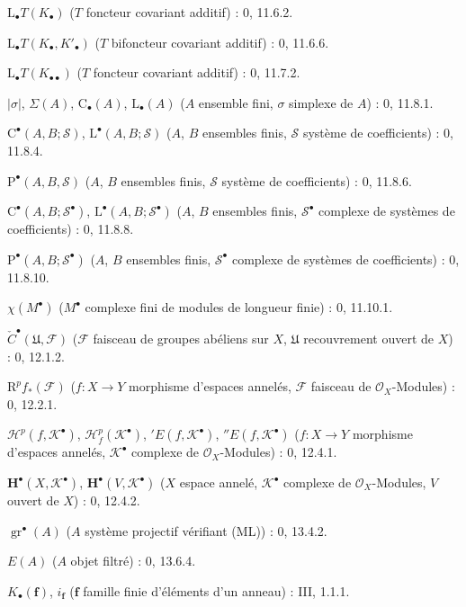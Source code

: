 \begin{flushleft}
$\mathrm L_\bullet T(K_\bullet)$ ($T$ foncteur covariant additif) : 0, 11.6.2.

$\mathrm L_\bullet T(K_\bullet,K'_\bullet)$ ($T$ bifoncteur covariant
additif) : 0, 11.6.6.

$\mathrm L_\bullet T(K_{\bullet\bullet})$ ($T$ foncteur covariant additif) :
0, 11.7.2.

$|\sigma|$, $\Sigma(A)$, $\mathrm C_\bullet(A)$, $\mathrm L_\bullet(A)$ ($A$ ensemble fini,
$\sigma$ simplexe de $A$) : 0, 11.8.1.

$\mathrm C^\bullet(A,B;\mathscr S)$, $\mathrm L^\bullet(A,B;\mathscr S)$ ($A$, $B$ ensembles
finis, $\mathscr S$ système de coefficients) : 0, 11.8.4.

$\mathrm P^\bullet(A,B,\mathscr S)$ ($A$, $B$ ensembles finis, $\mathscr S$ système
de coefficients) : 0, 11.8.6.

$\mathrm C^\bullet(A,B;\mathscr S^\bullet)$,
$\mathrm L^\bullet(A,B;\mathscr S^\bullet)$ ($A$, $B$ ensembles finis,
$\mathscr S^\bullet$ complexe de systèmes de coefficients) : 0, 11.8.8.

$\mathrm P^\bullet(A,B;\mathscr S^\bullet)$ ($A$, $B$ ensembles finis,
$\mathscr S^\bullet$ complexe de systèmes de coefficients) : 0, 11.8.10.

$\chi(M^\bullet)$ ($M^\bullet$ complexe fini de modules de longueur finie) :
0, 11.10.1.

$\check C^\bullet(\mathfrak U,\mathcal F)$ ($\mathcal F$ faisceau de groupes abéliens
sur $X$, $\mathfrak U$ recouvrement ouvert de $X$) : 0, 12.1.2.

$\mathrm R^pf_*(\mathcal F)$ ($f:X\to Y$ morphisme d'espaces annelés,
$\mathcal F$ faisceau de $\mathcal O_X$-Modules) : 0, 12.2.1.

$\mathcal H^p(f,\mathcal K^\bullet)$,
$\mathcal H_f^p(\mathcal K^\bullet)$, ${}'E(f,\mathcal K^\bullet)$,
${}''E(f,\mathcal K^\bullet)$ ($f:X\to Y$ morphisme d'espaces
annelés, $\mathcal K^\bullet$ complexe de $\mathcal O_X$-Modules) : 0, 12.4.1.

$\mathbf H^\bullet(X,\mathcal K^\bullet)$,
$\mathbf H^\bullet(V,\mathcal K^\bullet)$ ($X$ espace annelé,
$\mathcal K^\bullet$ complexe de $\mathcal O_X$-Modules, $V$ ouvert de $X$) :
0, 12.4.2.

$\operatorname{gr}^\bullet(A)$ ($A$ système projectif vérifiant (ML)) :
0, 13.4.2.

$E(A)$ ($A$ objet filtré) : 0, 13.6.4.

$K_\bullet(\mathbf f)$, $i_{\mathbf f}$ ($\mathbf f$ famille finie d'éléments
d'un anneau) : III, 1.1.1.


\end{flushleft}
